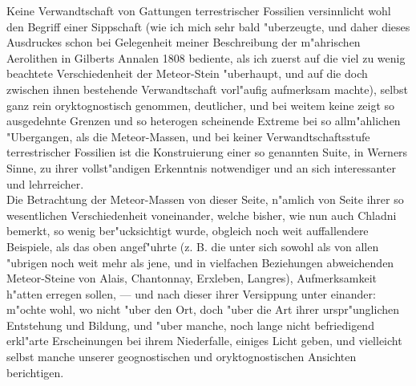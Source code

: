 \documentclass[a4paper, 11pt, oneside, german]{article}
\begin{document}
{\hspace*{6mm}Keine Verwandtschaft von Gattungen terrestrischer Fossilien versinnlicht wohl den Begriff einer Sippschaft (wie ich mich sehr bald "uberzeugte, und daher dieses Ausdruckes schon bei Gelegenheit meiner Beschreibung der m"ahrischen Aerolithen in Gilberts Annalen 1808 bediente, als ich zuerst auf die viel zu wenig beachtete Verschiedenheit der Meteor-Stein "uberhaupt, und auf die doch zwischen ihnen bestehende Verwandtschaft vorl"aufig aufmerksam machte), selbst ganz rein oryktognostisch genommen, deutlicher, und bei weitem keine zeigt so ausgedehnte Grenzen und so heterogen scheinende Extreme bei so allm"ahlichen "Ubergangen, als die Meteor-Massen, und bei keiner Verwandtschaftsstufe terrestrischer Fossilien ist die Konstruierung einer so genannten Suite, in Werners Sinne, zu ihrer vollst"andigen Erkenntnis notwendiger und an sich interessanter und lehrreicher.\\
\hspace*{6mm}Die Betrachtung der Meteor-Massen von dieser Seite, n"amlich von Seite ihrer so wesentlichen Verschiedenheit voneinander, welche bisher, wie nun auch Chladni bemerkt, so wenig ber"ucksichtigt wurde, obgleich noch weit auffallendere Beispiele, als das oben angef"uhrte (z. B. die unter sich sowohl als von allen "ubrigen noch weit mehr als jene, und in vielfachen Beziehungen abweichenden Meteor-Steine von Alais, Chantonnay, Erxleben, Langres), Aufmerksamkeit h"atten erregen sollen, --- und nach dieser ihrer Versippung unter einander: m"ochte wohl, wo nicht "uber den Ort, doch "uber die Art ihrer urspr"unglichen Entstehung und Bildung, und "uber manche, noch lange nicht befriedigend erkl"arte Erscheinungen bei ihrem Niederfalle, einiges Licht geben, und vielleicht selbst manche unserer geognostischen und oryktognostischen Ansichten berichtigen.}
\end{document}
